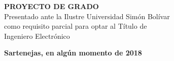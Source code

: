 		    \vspace{1cm}
    \begin{center}
        \textbf{PROYECTO DE GRADO}\\
				Presentado ante la Ilustre Universidad Simón Bolívar\\
				como requisito parcial para optar al Título de\\
				Ingeniero Electrónico\\
    \end{center}

	\vspace{1cm}
    \begin{center}
		\textbf{Sartenejas, en algún momento de 2018}
    \end{center}
    \pagebreak

